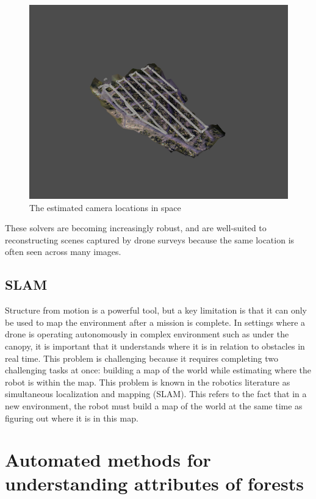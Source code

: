 \begin{figure}
    \centering
    \includegraphics[width=\textwidth]{figs/methods/structure_from_motion/camera estimation.png}
    \caption{The estimated camera locations in space}
    \label{fig:camera-locations}
\end{figure}

These solvers are becoming increasingly robust, and are well-suited to reconstructing scenes captured by drone surveys because the same location is often seen across many images.

\subsection{SLAM}
Structure from motion is a powerful tool, but a key limitation is that it can only be used to map the environment after a mission is complete. In settings where a drone is operating autonomously in complex environment such as under the canopy, it is important that it understands where it is in relation to obstacles in real time. This problem is challenging because it requires completing two challenging tasks at once: building a map of the world while estimating where the robot is within the map. This problem is known in the robotics literature as simultaneous localization and mapping (SLAM). This refers to the fact that in a new environment, the robot must build a map of the world at the same time as figuring out where it is in this map. 


\section{Automated methods for understanding attributes of forests}
